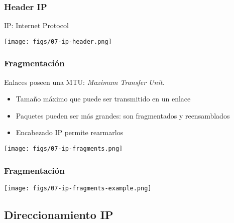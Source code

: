 \documentclass[letter]{beamer}
\begin{document}
\begin{frame}
  \frametitle{Header IP}

  IP: Internet Protocol
  \begin{center}
    \texttt{[image: figs/07-ip-header.png]}
  \end{center}
    
  
\end{frame}

\begin{frame}
  \frametitle{Fragmentación}

  Enlaces poseen una MTU: {\em Maximum Transfer Unit}.
  \begin{itemize}
    \item Tamaño máximo que puede ser transmitido en un enlace
    \item Paquetes pueden ser más grandes: son fragmentados y reensamblados
    \item Encabezado IP permite rearmarlos
  \end{itemize}

  \begin{center}
    \texttt{[image: figs/07-ip-fragments.png]}
  \end{center}

\end{frame}
\begin{frame}
  \frametitle{Fragmentación}

  \begin{center}
    \texttt{[image: figs/07-ip-fragments-example.png]}
  \end{center}

\end{frame}

\subsection{Direccionamiento IP}
\end{document}
